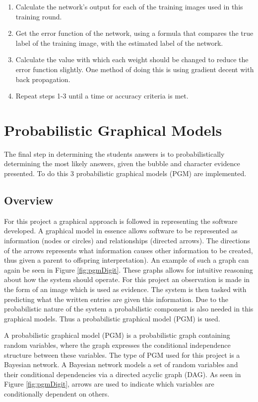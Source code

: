 \begin{enumerate}
\item Calculate the network's output for each of the training images used in this training round.
\item Get the error function of the network, using a formula that compares the true label of the training image, with the estimated label of the network.
\item Calculate the value with which each weight should be changed to reduce the error function slightly. One method of doing this is using gradient decent with back propagation.
\item Repeat steps 1-3 until a time or accuracy criteria is met.
\end{enumerate}
\section{Probabilistic Graphical Models}
\label{sec:PGM}

The final step in determining the students answers is to probabilistically determining the most likely answers, given the bubble and character evidence presented. To do this 3 probabilistic graphical models (PGM) are implemented.

\subsection{Overview}
For this project a graphical approach is followed in representing the software developed. A graphical model in essence allows software to be represented as information (nodes or circles) and relationships (directed arrows). The directions of the arrows represents what information causes other information to be created, thus given a parent to offspring interpretation). An example of such a graph can again be seen in Figure \ref{fig:pgmDigit}. These graphs allows for intuitive reasoning about how the system should operate. For this project an observation is made in the form of an image which is used as evidence. The system is then tasked with predicting what the written entries are given this information. Due to the probabilistic nature of the system a probabilistic component is also needed in this graphical models. Thus a probabilistic graphical model (PGM) is used.

A probabilistic graphical model (PGM) is a probabilistic graph containing random variables, where the graph expresses the conditional independence structure between these variables. The type of PGM used for this project is a Bayesian network. A Bayesian network models a set of random variables and their conditional dependencies via a directed acyclic graph (DAG). As seen in Figure \ref{fig:pgmDigit}, arrows are used to indicate which variables are conditionally dependent on others. 

